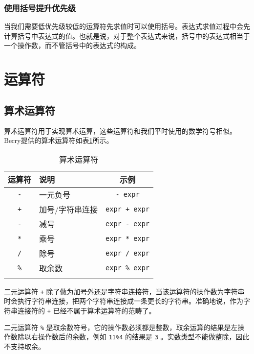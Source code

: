 \subsubsection{使用括号提升优先级}

当我们需要低优先级较低的运算符先求值时可以使用括号。表达式求值过程中会先计算括号中表达式的值。也就是说，对于整个表达式来说，括号中的表达式相当于一个操作数，而不管括号中的表达式的构成。

\section{运算符}

\subsection{算术运算符}

算术运算符用于实现算术运算，这些运算符和我们平时使用的数学符号相似。Berry提供的算术运算符如表\ref{tab::arthmetic_operator}所示。

\begin{table}[htb]
    \centering
    \setlength{\tabcolsep}{10mm}
    \begin{tabular}{clc} \Xhline{1pt}
        \textbf{运算符} & \textbf{说明} & \textbf{示例} \\ \hline
        \texttt{-} & 一元负号 & \texttt{- expr} \\
        \texttt{+} & 加号/字符串连接 & \texttt{expr + expr} \\
        \texttt{-} & 减号 & \texttt{expr - expr} \\
        \texttt{*} & 乘号 & \texttt{expr * expr} \\
        \texttt{/} & 除号 & \texttt{expr / expr} \\
        \texttt{\%} & 取余数 & \texttt{expr \% expr} \\
        \Xhline{1pt}
    \end{tabular}
    \caption{算术运算符}
    \label{tab::arthmetic_operator}
\end{table}

二元运算符 \texttt{+} 除了做为加号外还是字符串连接符，当该运算符的操作数为字符串时会执行字符串连接，把两个字符串连接成一条更长的字符串。准确地说，作为字符串连接符的 \texttt{+} 已经不属于算术运算符的范畴了。

二元运算符 \texttt{\%} 是取余数符号，它的操作数必须都是整数，取余运算的结果是左操作数除以右操作数后的余数，例如 \texttt{11\%4} 的结果是 \texttt{3} 。实数类型不能做整除，因此不支持取余。

